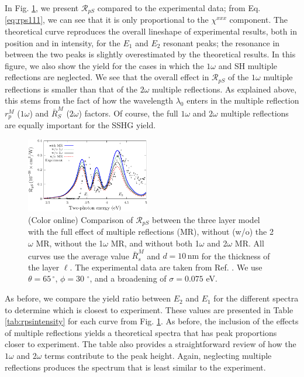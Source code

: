 \documentclass[aps,prb,10pt,showpacs,letterpaper,twocolumn]{revtex4-1}
\begin{document}
In Fig. \ref{fig:rps}, we present $\mathcal{R}_{pS}$ compared to the
experimental data; from Eq. \eqref{eq:rps111}, we can see that it is only
proportional to the $\chi^{xxx}$ component. The theoretical curve reproduces the
overall lineshape of experimental results, both in position and in intensity,
for the $E_1$ and $E_2$ resonant peaks; the resonance in between the two peaks
is slightly overestimated by the theoretical results. In this figure, we also
show the yield for the cases in which the $1\omega$ and SH multiple reflections
are neglected. We see that the overall effect in $\mathcal{R}_{pS}$ of the
$1\omega$ multiple reflections is smaller than that of the $2\omega$ multiple
reflections. As explained above, this stems from the fact of how the wavelength
$\lambda_{0}$ enters in the multiple reflection $r^{M}_p$ ($1\omega$) and
$\bar{R}^{M}_S$ ($2\omega$) factors. Of course, the full $1\omega$ and $2\omega$
multiple reflections are equally important for the SSHG yield.

\begin{figure}[t]
\includegraphics[width=0.48\textwidth]{fig4}
\caption{(Color online) Comparison of ${\mathcal R}_{pS}$ between the three
layer model with the full effect of multiple reflections (MR), without (w/o) the
2$\omega$ MR, without the 1$\omega$ MR, and without both 1$\omega$ and 2$\omega$
MR. All curves use the average value $\bar{R}^{M}_{s}$ and $d = 10\,\mathrm{nm}$
for the thickness of the layer $\ell$. The experimental data are taken from Ref.
. We use $\theta = 65\,^{\circ}$, $\phi =
30\,\,^{\circ}$, and a broadening of $\sigma = 0.075$ eV.}
\label{fig:rps}
\end{figure}

{\color{red}
As before, we compare the yield ratio between $E_{2}$ and $E_{1}$ for the
different spectra to determine which is closest to experiment. These values are
presented in Table \ref{tab:rpsintensity} for each curve from Fig.
\ref{fig:rps}. As before, the inclusion of the effects of multiple reflections
yields a theoretical spectra that has peak proportions closer to experiment. The
table also provides a straightforward review of how the $1\omega$ and $2\omega$
terms contribute to the peak height. Again, neglecting multiple reflections
produces the spectrum that is least similar to the experiment.
}
\end{document}
